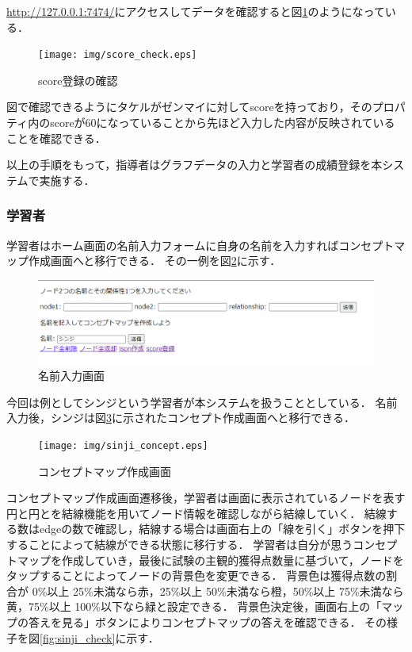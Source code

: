 \url{http://127.0.0.1:7474/}にアクセスしてデータを確認すると図\ref{fig:score_check}のようになっている．

\begin{figure}[htbp]
\begin{center}
\texttt{[image: img/score\_check.eps]}
\end{center}
\caption{score登録の確認}
\label{fig:score_check}
\end{figure}
    
図で確認できるようにタケルがゼンマイに対してscoreを持っており，そのプロパティ内のscoreが60になっていることから先ほど入力した内容が反映されていることを確認できる．

以上の手順をもって，指導者はグラフデータの入力と学習者の成績登録を本システムで実施する．
\newpage

\subsubsection{学習者}
学習者はホーム画面の名前入力フォームに自身の名前を入力すればコンセプトマップ作成画面へと移行できる．
その一例を図\ref{fig:name_enter}に示す．

\begin{figure}[htbp]
\begin{center}
\includegraphics[width=18cm]{img/name_enter.eps}
\end{center}
\caption{名前入力画面}
\label{fig:name_enter}
\end{figure}

今回は例としてシンジという学習者が本システムを扱うこととしている．
名前入力後，シンジは図\ref{fig:sinji_concept}に示されたコンセプト作成画面へと移行できる．

\begin{figure}[htbp]
\begin{center}
\texttt{[image: img/sinji\_concept.eps]}
\end{center}
\caption{コンセプトマップ作成画面}
\label{fig:sinji_concept}
\end{figure}
\newpage

コンセプトマップ作成画面遷移後，学習者は画面に表示されているノードを表す円と円とを結線機能を用いてノード情報を確認しながら結線していく．
結線する数はedgeの数で確認し，結線する場合は画面右上の「線を引く」ボタンを押下することによって結線ができる状態に移行する．
学習者は自分が思うコンセプトマップを作成していき，最後に試験の主観的獲得点数量に基づいて，ノードをタップすることによってノードの背景色を変更できる．
背景色は獲得点数の割合が 0\%以上 25\%未満なら赤，25\%以上 50\%未満なら橙，50\%以上 75\%未満なら黄，75\%以上 100\%以下なら緑と設定できる．
背景色決定後，画面右上の「マップの答えを見る」ボタンによりコンセプトマップの答えを確認できる．
その様子を図\ref{fig:sinji_check}に示す．

